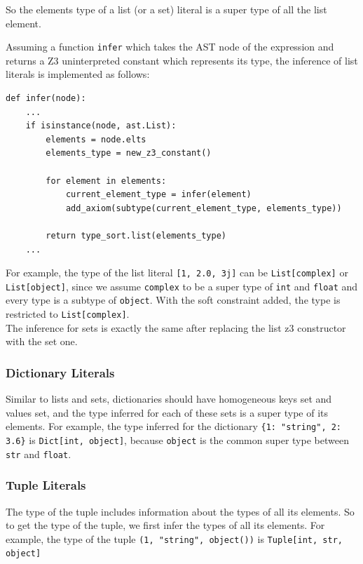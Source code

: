 So the elements type of a list (or a set) literal is a super type of all the list element.

Assuming a function \lstinline|infer| which takes the AST node of the expression and returns a Z3 uninterpreted constant which represents its type, the inference of list literals is implemented as follows:

\begin{lstlisting}
def infer(node):
	...
	if isinstance(node, ast.List):
		elements = node.elts
		elements_type = new_z3_constant()
		
		for element in elements:
			current_element_type = infer(element)
			add_axiom(subtype(current_element_type, elements_type))
			
		return type_sort.list(elements_type)
	...
\end{lstlisting}

For example, the type of the list literal \lstinline|[1, 2.0, 3j]| can be \lstinline|List[complex]| or \lstinline|List[object]|, since we assume \lstinline|complex| to be a super type of \lstinline|int| and \lstinline|float| and every type is a subtype of \lstinline|object|. With the soft constraint added, the type is restricted to \lstinline|List[complex]|.\\

The inference for sets is exactly the same after replacing the list z3 constructor with the set one.


\subsubsection{Dictionary Literals}
Similar to lists and sets, dictionaries should have homogeneous keys set and values set, and the type inferred for each of these sets is a super type of its elements. For example, the type inferred for the dictionary \lstinline|{1: "string", 2: 3.6}| is \lstinline|Dict[int, object]|, because \lstinline|object| is the common super type between \lstinline|str| and \lstinline|float|.


\subsubsection{Tuple Literals}
The type of the tuple includes information about the types of all its elements. So to get the type of the tuple, we first infer the types of all its elements. For example, the type of the tuple \lstinline|(1, "string", object())| is \lstinline|Tuple[int, str, object]|

